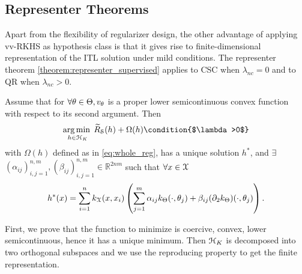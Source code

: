 \subsection{Representer Theorems}
Apart from the flexibility of regularizer design, the other advantage of
applying vv-RKHS as hypothesis class is that it gives rise to
finite-dimensional representation of the ITL solution under mild conditions.
The representer theorem  \cref{theorem:representer_supervised} applies to
\ac{CSC} when $\lambda_{nc}=0$ and to \ac{QR} when $\lambda_{nc} > 0$.
\begin{proposition}[Representer] \label{theorem:representer_supervised}
    Assume that for $\forall \theta \in \Theta,
    v_{\theta}$ is a proper lower semicontinuous convex
    function with respect to its second argument. Then
    \begin{align*}
        \argmin_{h \in \mcH_{K}} \sampledempiricalrisk(h) + \Omega (h)
        \condition{$\lambda >0$}
    \end{align*}
    with $\Omega(h)$ defined as in \cref{eq:whole_reg}, has a unique solution
    $h^*$, and $\exists$ $\left(\alpha_{ij}\right)_{i,j = 1}^{n,m},
    \left(\beta_{ij}\right)_{i,j = 1}^{n,m} \in \mathbb{R}^{2nm}$ such that
    $\forall x \in \mathcal{X}$
    {\small\begin{dmath*}
        h^*(x) = \sum_{i=1}^{n} k_{\inputspace}(x, x_i)\left(\sum_{j=1}^m
        \alpha_{ij} k_{\hyperparameterspace}(\cdot,\hyperparameter_j) +
        \beta_{ij}(\partial_2
        k_{\hyperparameterspace})(\cdot,\hyperparameter_j)\right).
    \end{dmath*}}
\end{proposition}
\begin{sproof}
    First, we prove that the function to minimize is coercive, convex, lower
    semicontinuous, hence it has a unique minimum. Then $\mathcal{H}_K$ is decomposed
    into two orthogonal subspaces and we use the reproducing property to get
    the finite representation.%
\end{sproof}
